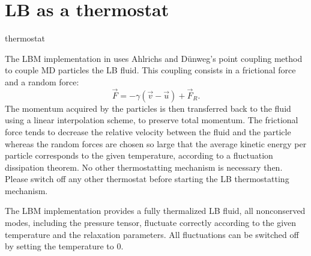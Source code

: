 \section{LB as a thermostat}
\begin{essyntax}
  thermostat  
  \begin{features}
  \end{features}
\end{essyntax}
The LBM implementation in \es uses Ahlrichs and D\"unweg's point coupling method
to couple MD particles the LB fluid. This coupling consists
in a frictional force and a random force:
\begin{equation*}
  \vec{F} = -\gamma \left(\vec{v}-\vec{u}\right) + \vec{F}_R.
\end{equation*}
The momentum acquired by the particles is then transferred back to the fluid using a linear interpolation scheme, to preserve total momentum.
The frictional force tends to decrease the relative velocity
between the fluid and the particle whereas the random forces are chosen
so large that the average kinetic energy per particle corresponds to
the given temperature, according to a fluctuation dissipation theorem.
No other thermostatting mechanism is necessary then. Please switch off any other thermostat 
 before starting the LB thermostatting mechanism.

The LBM implementation provides a fully thermalized LB fluid, \ie all
nonconserved modes, including the pressure tensor, fluctuate correctly
according to the given temperature and the relaxation parameters. All
fluctuations can be switched off by setting the temperature to 0.

